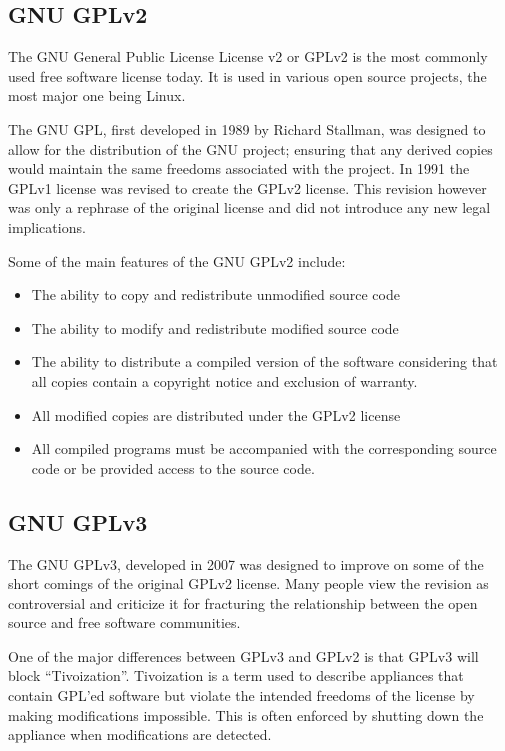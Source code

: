 \documentclass[12pt,letterpaper]{article}
\begin{document}
\subsection{GNU GPLv2}

The GNU General Public License License v2 or GPLv2 is the most commonly used free software license today. It is used in various open source projects, the most major one being Linux.

The GNU GPL, first developed in 1989 by Richard Stallman, was designed to allow for the distribution of the GNU project; ensuring that any derived copies would maintain the same freedoms associated with the project. In 1991 the GPLv1 license was revised to create the GPLv2 license. This revision however was only a rephrase of the original license and did not introduce any new legal implications.

Some of the main features of the GNU GPLv2 include: \cite{gpl2}

\begin{itemize}
\item The ability to copy and redistribute unmodified source code
\item The ability to modify and redistribute modified source code
\item The ability to distribute a compiled version of the software considering that all copies contain a copyright notice and exclusion of warranty.
\item All modified copies are distributed under the GPLv2 license
\item All compiled programs must be accompanied with the corresponding source code or be provided access to the source code.
\end{itemize}

\subsection{GNU GPLv3}

The GNU GPLv3, developed in 2007 was designed to improve on some of the short comings of the original GPLv2 license. Many people view the revision as controversial and criticize it for fracturing the relationship between the open source and free software communities.

One of the major differences between GPLv3 and GPLv2 is that GPLv3 will block ``Tivoization''. Tivoization is a term used to describe appliances that contain GPL'ed software but violate the intended freedoms of the license by making modifications impossible. This is often enforced by shutting down the appliance when modifications are detected.
\end{document}
